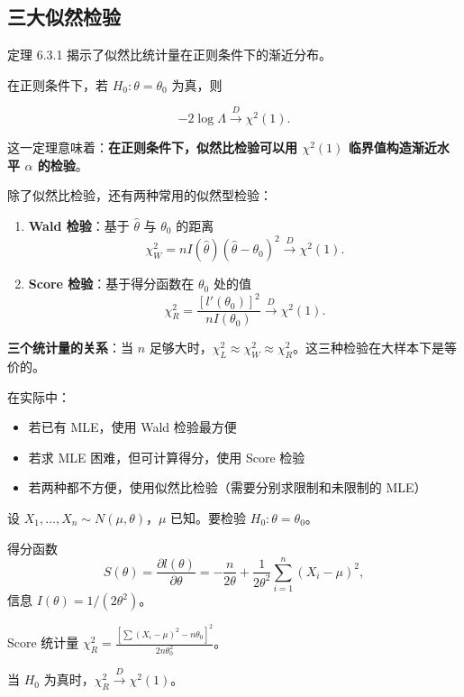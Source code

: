\subsection{三大似然检验}

定理 6.3.1 揭示了似然比统计量在正则条件下的渐近分布。

\begin{theorem}[似然比检验的渐近分布]\label{th:lrt-asymptotic}
在正则条件下，若 $H_0: \theta = \theta_0$ 为真，则

\[
-2\log\Lambda \xrightarrow{D} \chi^2(1).
\label{eq:lrt-asymptotic}
\]
\end{theorem}

这一定理意味着：\textbf{在正则条件下，似然比检验可以用 $\chi^2(1)$ 临界值构造渐近水平 $\alpha$ 的检验}。

除了似然比检验，还有两种常用的似然型检验：

\begin{enumerate}
\item \textbf{Wald 检验}：基于 $\widehat{\theta}$ 与 $\theta_0$ 的距离
\[
\chi_W^2 = n I(\widehat{\theta})(\widehat{\theta} - \theta_0)^2 \xrightarrow{D} \chi^2(1).
\label{eq:wald-statistic}
\]

\item \textbf{Score 检验}：基于得分函数在 $\theta_0$ 处的值
\[
\chi_R^2 = \frac{[l'(\theta_0)]^2}{n I(\theta_0)} \xrightarrow{D} \chi^2(1).
\label{eq:score-statistic}
\]
\end{enumerate}

\begin{remark}
\textbf{三个统计量的关系}：当 $n$ 足够大时，$\chi_L^2 \approx \chi_W^2 \approx \chi_R^2$。这三种检验在大样本下是等价的。

在实际中：
\begin{itemize}
\item 若已有 MLE，使用 Wald 检验最方便
\item 若求 MLE 困难，但可计算得分，使用 Score 检验
\item 若两种都不方便，使用似然比检验（需要分别求限制和未限制的 MLE）
\end{itemize}
\end{remark}

\begin{example}\label{ex:normal-variance-score}
设 $X_1, \ldots, X_n \sim N(\mu, \theta)$，$\mu$ 已知。要检验 $H_0: \theta = \theta_0$。

得分函数
\[
S(\theta)=\frac{\partial l(\theta)}{\partial \theta}
= -\frac{n}{2\theta}+\frac{1}{2\theta^2}\sum_{i=1}^n (X_i-\mu)^2,
\]
信息 $I(\theta)=1/(2\theta^2)$。

Score 统计量 $\chi_R^2 = \frac{[\sum(X_i-\mu)^2 - n\theta_0]^2}{2n\theta_0^2}$。

当 $H_0$ 为真时，$\chi_R^2 \xrightarrow{D} \chi^2(1)$。
\end{example}

